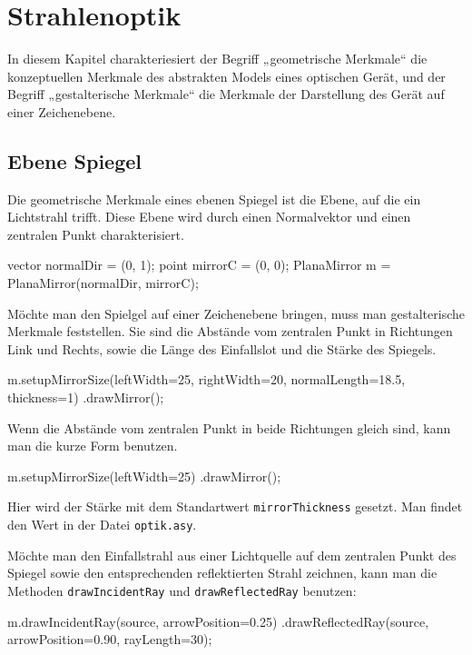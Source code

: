 \chapter{Strahlenoptik}

In diesem Kapitel charakteriesiert der Begriff „geometrische Merkmale“ die konzeptuellen Merkmale des abstrakten Models eines optischen Gerät,
und der Begriff „gestalterische Merkmale“ die Merkmale der Darstellung des Gerät auf einer Zeichenebene.

\section{Ebene Spiegel}

Die geometrische Merkmale eines ebenen Spiegel ist die Ebene, auf die ein Lichtstrahl trifft.
Diese Ebene wird durch einen Normalvektor und einen zentralen Punkt charakterisiert.

\begin{asycode}
vector normalDir = (0, 1);
point mirrorC = (0, 0);
PlanaMirror m = PlanaMirror(normalDir, mirrorC);
\end{asycode}

Möchte man den Spielgel auf einer Zeichenebene bringen, muss man gestalterische Merkmale feststellen.
Sie sind die Abstände vom zentralen Punkt in Richtungen Link und Rechts, sowie die Länge des Einfallslot und die Stärke des Spiegels.

\begin{asycode}
m.setupMirrorSize(leftWidth=25, rightWidth=20, normalLength=18.5, thickness=1)
 .drawMirror();
\end{asycode}

Wenn die Abstände vom zentralen Punkt in beide Richtungen gleich sind, kann man die kurze Form benutzen.

\begin{asycode}
m.setupMirrorSize(leftWidth=25)
 .drawMirror();
\end{asycode}

Hier wird der Stärke mit dem Standartwert \texttt{mirrorThickness} gesetzt.
Man findet den Wert in der Datei \texttt{optik.asy}.

Möchte man den Einfallstrahl aus einer Lichtquelle auf dem zentralen Punkt des Spiegel sowie den entsprechenden reflektierten Strahl zeichnen,
kann man die Methoden \texttt{drawIncidentRay} und \texttt{drawReflectedRay} benutzen:

\begin{asycode}
m.drawIncidentRay(source, arrowPosition=0.25)
 .drawReflectedRay(source, arrowPosition=0.90, rayLength=30); 
\end{asycode}


